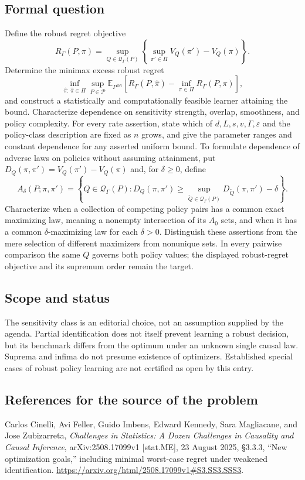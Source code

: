 \documentclass[11pt,a4paper]{article}
\newcommand{\E}{\mathbb E}
\begin{document}
\subsection*{Formal question}
Define the robust regret objective
\[
 R_\Gamma(P,\pi)=\sup_{Q\in\mathcal Q_\Gamma(P)}
 \left\{\sup_{\pi'\in\Pi}V_Q(\pi')-V_Q(\pi)\right\}.
\]
Determine the minimax excess robust regret
\[
 \inf_{\widehat\pi:\,\widehat\pi\in\Pi}\sup_{P\in\mathcal P}
 \E_{P^{\otimes n}}\left[R_\Gamma(P,\widehat\pi)-
       \inf_{\pi\in\Pi}R_\Gamma(P,\pi)\right],
\]
and construct a statistically and computationally feasible learner attaining the bound. Characterize dependence on sensitivity strength, overlap, smoothness, and policy complexity. For every rate assertion, state which of $d,L,s,v,\Gamma,\varepsilon$ and the policy-class description are fixed as $n$ grows, and give the parameter ranges and constant dependence for any asserted uniform bound. To formulate dependence of adverse laws on policies without assuming attainment, put $D_Q(\pi,\pi')=V_Q(\pi')-V_Q(\pi)$ and, for $\delta\geq0$, define
\[
 A_\delta(P;\pi,\pi')=
 \left\{Q\in\mathcal Q_\Gamma(P):
 D_Q(\pi,\pi')\geq
 \sup_{\widetilde Q\in\mathcal Q_\Gamma(P)}D_{\widetilde Q}(\pi,\pi')-\delta\right\}.
\]
Characterize when a collection of competing policy pairs has a common exact maximizing law, meaning a nonempty intersection of its $A_0$ sets, and when it has a common $\delta$-maximizing law for each $\delta>0$. Distinguish these assertions from the mere selection of different maximizers from nonunique sets. In every pairwise comparison the same $Q$ governs both policy values; the displayed robust-regret objective and its supremum order remain the target.
\subsection*{Scope and status}
The sensitivity class is an editorial choice, not an assumption supplied by the agenda. Partial identification does not itself prevent learning a robust decision, but its benchmark differs from the optimum under an unknown single causal law. Suprema and infima do not presume existence of optimizers. Established special cases of robust policy learning are not certified as open by this entry.
\subsection*{References for the source of the problem}
Carlos Cinelli, Avi Feller, Guido Imbens, Edward Kennedy, Sara Magliacane, and Jose Zubizarreta, \emph{Challenges in Statistics: A Dozen Challenges in Causality and Causal Inference}, arXiv:2508.17099v1 [stat.ME], 23 August 2025, \S3.3.3, ``New optimization goals,'' including minimal worst-case regret under weakened identification. \url{https://arxiv.org/html/2508.17099v1#S3.SS3.SSS3}.
\end{document}
